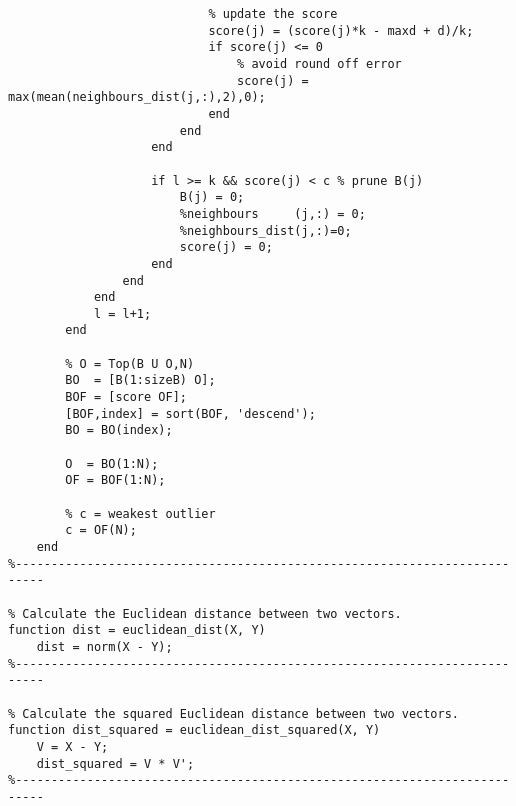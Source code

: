\begin{lstlisting}
                            % update the score
                            score(j) = (score(j)*k - maxd + d)/k;
                            if score(j) <= 0
                                % avoid round off error
                                score(j) = max(mean(neighbours_dist(j,:),2),0);
                            end
                        end
                    end

                    if l >= k && score(j) < c % prune B(j)
                        B(j) = 0;
                        %neighbours     (j,:) = 0;
                        %neighbours_dist(j,:)=0;
                        score(j) = 0;
                    end
                end
            end
            l = l+1;
        end

        % O = Top(B U O,N)
        BO  = [B(1:sizeB) O];
        BOF = [score OF];
        [BOF,index] = sort(BOF, 'descend');
        BO = BO(index);

        O  = BO(1:N);
        OF = BOF(1:N);

        % c = weakest outlier
        c = OF(N);
    end
%--------------------------------------------------------------------------

% Calculate the Euclidean distance between two vectors.
function dist = euclidean_dist(X, Y)
    dist = norm(X - Y);
%--------------------------------------------------------------------------

% Calculate the squared Euclidean distance between two vectors.
function dist_squared = euclidean_dist_squared(X, Y)
    V = X - Y;
    dist_squared = V * V';
%--------------------------------------------------------------------------
\end{lstlisting}
\lstset{language=Matlab}
